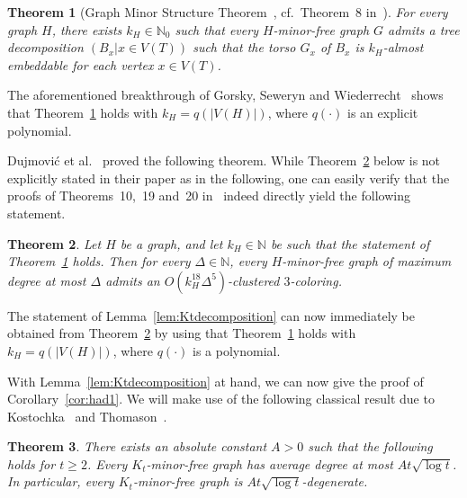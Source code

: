 \documentclass[10pt]{amsart}
\newtheorem{theorem}{Theorem}[section]
\theoremstyle{definition}
\begin{document}
\begin{theorem}[Graph Minor Structure Theorem~\cite{RS}, cf.~Theorem~8 in~\cite{dujmovic}]\label{thm:graphminors}
For every graph $H$, there exists $k_H\in \mathbb{N}_0$ such that every $H$-minor-free graph $G$ admits a tree decomposition $(B_x|x\in V(T))$ such that the torso $G_x$ of $B_x$ is $k_H$-almost
embeddable for each vertex $x\in V(T)$.
\end{theorem}
The aforementioned breakthrough of Gorsky, Seweryn and Wiederrecht~\cite{gowi} shows that Theorem~\ref{thm:graphminors} holds with $k_H=q(|V(H)|)$, where $q(\cdot)$ is an explicit polynomial.

Dujmovi\'{c} et al.~\cite{dujmovic} proved the following theorem. While Theorem~\ref{thm:partition} below is not explicitly stated in their paper as in the following, one can easily verify that the proofs of Theorems~10,~19 and~20 in~\cite{dujmovic} indeed directly yield the following statement.

\begin{theorem}\label{thm:partition}
Let $H$ be a graph, and let $k_H\in \mathbb{N}$ be such that the statement of Theorem~\ref{thm:graphminors} holds. Then for every $\Delta\in\mathbb{N}$, every $H$-minor-free graph of maximum degree at most $\Delta$ admits an $O(k_H^{18}\Delta^5)$-clustered $3$-coloring. 
\end{theorem}

The statement of Lemma~\ref{lem:Ktdecomposition} can now immediately be obtained from Theorem~\ref{thm:partition} by using that Theorem~\ref{thm:graphminors} holds with $k_H=q(|V(H)|)$, where $q(\cdot)$ is a polynomial.

With Lemma~\ref{lem:Ktdecomposition} at hand, we can now give the proof of Corollary~\ref{cor:had1}. We will make use of the following classical result due to Kostochka~\cite{kostochka} and Thomason~\cite{thomason}. 

\begin{theorem}\label{thm:kostthomas}
There exists an absolute constant $A>0$ such that the following holds for $t\ge 2$. 
Every $K_t$-minor-free graph has average degree at most $At\sqrt{\log t}$. In particular, every $K_t$-minor-free graph is $At\sqrt{\log t}$-degenerate. 
\end{theorem}
 
\end{document}
